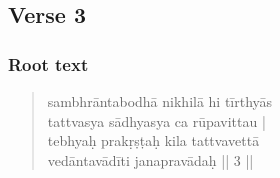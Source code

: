 \documentclass[12pt]{article}
\begin{document}
% 

\subsection{Verse 3}
\subsubsection{Root text}
\begin{quote}
	sambhrāntabodhā nikhilā hi tīrthyās \\%
	tattvasya sādhyasya ca rūpavittau |\\
	tebhyaḥ prakṛṣṭaḥ kila tattvavettā\\
	vedāntavādīti janapravādaḥ || 3 ||

% 
\end{quote}
\end{document}
